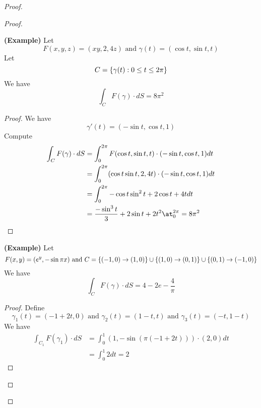 \documentclass{report}
\begin{document}
\begin{proof}
\begin{proof}
\begin{theorem}
\end{theorem}
\begin{theorem}
\textbf{(Example)} Let
\begin{equation}
F(x,y,z)=(xy,2,4z)\text{ and }\gamma (t)=(\cos t,\sin t,t)
\end{equation}
Let 
\begin{equation}
C=\{ \gamma (t):0\leq t\leq 2\pi  \}
\end{equation}
We have
\begin{equation}
\int_C F(\gamma )\cdot dS=8\pi^2
\end{equation}
\end{theorem}
\begin{proof}
We have
\begin{equation}
\gamma '(t)=(-\sin t,\cos t,1)
\end{equation}
Compute
\begin{align}
\int_C F(\gamma )\cdot dS&= \int_0^{2\pi} F(\cos t,\sin t,t)\cdot (-\sin t, \cos t,1)dt\\
&=\int_0^{2\pi} (\cos t\sin t, 2, 4t)\cdot (-\sin t,\cos t,1)dt\\
&=\int_0^{2\pi} -\cos t\sin^2 t+2\cos t+4tdt\\
&=\frac{-\sin^3 t}{3}+2\sin t+2t^2 \at_{0}^{2\pi}=8\pi^2
\end{align}
\end{proof}
\begin{theorem}
\textbf{(Example)} Let
\begin{equation}
F(x,y)=(e^{y},-\sin \pi x)\text{ and }C=\{ (-1,0)\to (1,0) \}\cup \{ (1,0)\to (0,1) \}\cup \{ (0,1)\to (-1,0) \}
\end{equation}
We have
\begin{equation}
\int_C F(\gamma )\cdot dS=4-2e-\frac{4}{\pi}
\end{equation}
\end{theorem}
\begin{proof}
Define
\begin{equation}
\gamma_1 (t)=(-1+2t,0)\text{ and }\gamma_2 (t)=(1-t,t)\text{ and }\gamma _3(t)=(-t,1-t)
\end{equation}
We have
\begin{align}
\int_{C_1}F(\gamma _1)\cdot dS&= \int_0^1 (1,- \sin (\pi (-1+2t)))\cdot (2,0) dt\\
&=\int_0^1 2dt=2
\end{align}

\end{proof}
\end{proof}
\end{proof}
\end{document}
